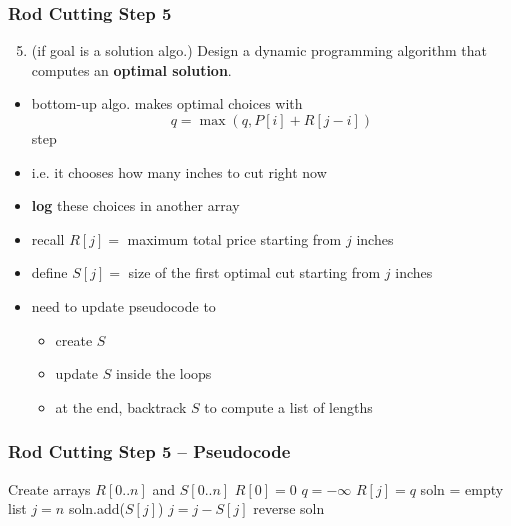\documentclass{beamer}
\begin{document}
\begin{frame} \frametitle{Rod Cutting Step 5}
  \begin{enumerate}
    \setcounter{enumi}{4}
    \item (if goal is a solution algo.) Design a dynamic programming algorithm that computes an \textbf{optimal solution}.
  \end{enumerate}

  \begin{itemize}
    \item bottom-up algo. makes optimal choices with
      \[ q = \max(q, P[i] + R[j-i]) \]
      step
    \item i.e. it chooses how many inches to cut right now
    \item \textbf{log} these choices in another array
    \item recall $R[j] = $ maximum total price starting from $j$ inches
    \item define $S[j] = $ size of the first optimal cut starting from $j$ inches
    \item need to update pseudocode to
    \begin{itemize}
      \item create $S$
      \item update $S$ inside the loops
      \item at the end, backtrack $S$ to compute a list of lengths
    \end{itemize}
  \end{itemize}
\end{frame}

\begin{frame} \frametitle{Rod Cutting Step 5 -- Pseudocode}
  {\tiny
  \begin{algorithmic}[1]
    \State Create arrays $R[0..n]$ and $S[0..n]$
    \State $R[0] = 0$
      \State $q=-\infty$
        \EndIf
      \EndFor
      \State $R[j] = q$
    \EndFor
    \State soln = empty list
    \State $j = n$
      \State soln.add($S[j]$)
      \State $j = j - S[j]$
    \EndWhile
    \State reverse soln
    \State {}
    \EndFunction
  \end{algorithmic}
  }
\end{frame}
\end{document}
